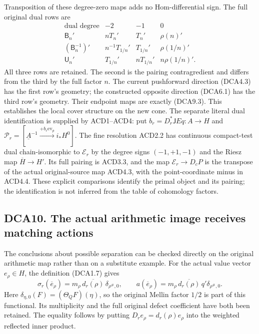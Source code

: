 Transposition of these degree-zero maps adds no Hom-differential sign.
The full original dual rows are \[
\begin{array}{c|ccc}
\text{dual degree}&-2&-1&0\\\hline
\mathsf B_n'&nT_n'&T_n'&\rho(n)'\\
(\mathsf B_n^{-1})'&n^{-1}T_{1/n}'&T_{1/n}'&\rho(1/n)'\\
\mathsf U_n'&T_{1/n}'&nT_{1/n}'&n\rho(1/n)'.
\end{array}
\tag{DCA9.7}
\] All three rows are retained. The second is the pairing contragredient
and differs from the third by the full factor \(n\). The current
pushforward direction (DCA4.3) has the first row's geometry; the
constructed opposite direction (DCA6.1) has the third row's geometry.
Their endpoint maps are exactly (DCA9.3). This establishes the local
cover structure on the new cone. The separate literal dual
identification is supplied by ACD1--ACD4: put
\(b_r=D_r^*\mathsf JEq:A\to H\) and
\(\mathscr P_r=[\underline A^{-1}\xrightarrow{+b_r\mathrm{ev}_p}i_*H^0]\).
The fine resolution ACD2.2 has continuous compact-test dual
chain-isomorphic to \(\mathscr E_r\) by the degree signs \((-1,+1,-1)\)
and the Riesz map \(\overline H\to H'\). Its full pairing is ACD3.3, and
the map \(\mathscr E_r\to D_cP\) is the transpose of the actual
original-source map ACD4.3, with the point-coordinate minus in ACD4.4.
These explicit comparisons identify the primal object and its pairing;
the identification is not inferred from the table of cohomology factors.

\subsection{DCA10. The actual arithmetic image receives matching
actions}\label{dca10.-the-actual-arithmetic-image-receives-matching-actions}

The conclusions about possible separation can be checked directly on the
original arithmetic map rather than on a substitute example. For the
actual value vector \(e_\rho\in H\), the definition (DCA1.7) gives \[
\sigma_r(\overline e_\rho)
=m_\rho\,\overline{d_r(\rho)}\,\delta_{\rho^\#,0},\qquad
a(\overline e_\rho)
=m_\rho\,\overline{d_r(\rho)}\,q'\delta_{\rho^\#,0}.
\tag{DCA10.1}
\] Here \(\delta_{\eta,0}(F)=(\Theta_QF)(\eta)\), so the original Mellin
factor \(1/2\) is part of this functional. Its multiplicity and the full
original defect coefficient have both been retained. The equality
follows by putting \(D_re_\rho=d_r(\rho)e_\rho\) into the weighted
reflected inner product.

